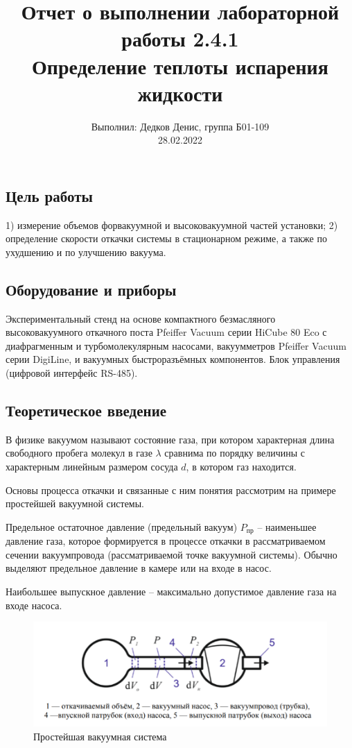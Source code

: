 \documentclass[12pt,a4paper]{article}
\author{\normalsize Выполнил: Дедков Денис, группа Б01-109 \\
	\normalsize 28.02.2022}
\date{}
\title{
	\large Отчет о выполнении лабораторной работы 2.4.1 \\
	\Large Определение теплоты испарения жидкости \\ 
	
}
\begin{document}
	\maketitle
	\subsection*{Цель работы} 
	  1) измерение объемов форвакуумной и высоковакуумной частей установки; 2) определение скорости откачки системы в стационарном режиме, а также по ухудшению и по улучшению вакуума. 
	
	\subsection*{Оборудование и приборы} Экспериментальный стенд на основе компактного безмасляного высоковакуумного откачного поста Pfeiffer Vacuum серии
	HiCube 80 Eco с диафрагменным и турбомолекулярным насосами, вакуумметров Pfeiffer Vacuum серии DigiLine, и вакуумных быстроразъёмных
	компонентов. Блок управления (цифровой интерфейс RS-485).
	
	
\subsection*{Теоретическое введение}

В физике вакуумом называют состояние газа, при котором характерная длина свободного пробега молекул в газе $\lambda$ сравнима по порядку
величины с характерным линейным размером сосуда $d$, в котором газ
находится.

Основы процесса откачки и связанные с ним понятия рассмотрим
на примере простейшей вакуумной системы.

Предельное остаточное давление (предельный вакуум) $P_{\text{пр}}$ -- наименьшее давление газа, которое формируется в процессе откачки в рассматриваемом сечении вакуумпровода (рассматриваемой точке вакуумной системы). Обычно выделяют предельное давление в
камере или на входе в насос.

Наибольшее выпускное давление -- максимально допустимое давление газа на входе насоса.

\begin{figure}[h]
	\centering
	\includegraphics[width = 11 cm]{res/1}
	\caption{Простейшая вакуумная система}
	\label{fig:vac}
\end{figure}
\end{document}
